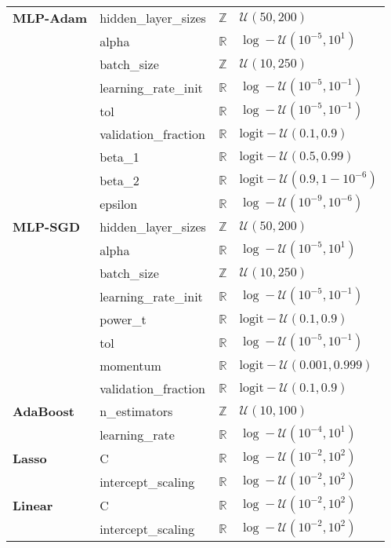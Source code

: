 \documentclass[jair,twoside,11pt,theapa]{article}
\theoremstyle{definition}
\begin{document}
\begin{table}[t!]
\begin{tabular}{llcl}
\textbf{MLP-Adam} &  hidden\_layer\_sizes & $\mathbb{Z}$ & $\mathcal{U}(50, 200)$ \\ 
\ & alpha & $\mathbb{R}$ & $\log-\mathcal{U}(10^{-5}, 10^{1})$ \\ 
\ & batch\_size & $\mathbb{Z}$ & $\mathcal{U}(10, 250)$ \\ 
\ & learning\_rate\_init & $\mathbb{R}$ & $\log-\mathcal{U}(10^{-5}, 10^{-1})$ \\ 
\ & tol & $\mathbb{R}$ & $\log-\mathcal{U}(10^{-5}, 10^{-1})$ \\ 
\ & validation\_fraction & $\mathbb{R}$ & $\text{logit}-\mathcal{U}(0.1, 0.9)$ \\ 
\ & beta\_1 & $\mathbb{R}$ & $\text{logit}-\mathcal{U}(0.5, 0.99)$ \\ 
\ & beta\_2 & $\mathbb{R}$ & $\text{logit}-\mathcal{U}(0.9, 1 - 10^{-6})$ \\ 
\ & epsilon & $\mathbb{R}$ & $\log-\mathcal{U}(10^{-9}, 10^{-6})$ \\ 
\textbf{MLP-SGD} &  hidden\_layer\_sizes & $\mathbb{Z}$ & $\mathcal{U}(50, 200)$ \\ 
\ & alpha & $\mathbb{R}$ & $\log-\mathcal{U}(10^{-5}, 10^{1})$ \\ 
\ & batch\_size & $\mathbb{Z}$ & $\mathcal{U}(10, 250)$ \\ 
\ & learning\_rate\_init & $\mathbb{R}$ & $\log-\mathcal{U}(10^{-5}, 10^{-1})$ \\ 
\ & power\_t & $\mathbb{R}$ & $\text{logit}-\mathcal{U}(0.1, 0.9)$ \\ 
\ & tol & $\mathbb{R}$ & $\log-\mathcal{U}(10^{-5}, 10^{-1})$ \\ 
\ & momentum & $\mathbb{R}$ & $\text{logit}-\mathcal{U}(0.001, 0.999)$ \\ 
\ & validation\_fraction & $\mathbb{R}$ & $\text{logit}-\mathcal{U}(0.1, 0.9)$ \\ 
\textbf{AdaBoost} &  n\_estimators & $\mathbb{Z}$ & $\mathcal{U}(10, 100)$ \\ 
\ & learning\_rate & $\mathbb{R}$ & $\log-\mathcal{U}(10^{-4}, 10^{1})$ \\ 
\textbf{Lasso} &  C & $\mathbb{R}$ & $\log-\mathcal{U}(10^{-2}, 10^{2})$ \\ 
\ & intercept\_scaling & $\mathbb{R}$ & $\log-\mathcal{U}(10^{-2}, 10^{2})$ \\ 
\textbf{Linear} &  C & $\mathbb{R}$ & $\log-\mathcal{U}(10^{-2}, 10^{2})$ \\ 
\ & intercept\_scaling & $\mathbb{R}$ & $\log-\mathcal{U}(10^{-2}, 10^{2})$ \\ 
\bottomrule
\end{tabular}
\end{table}
\end{document}
